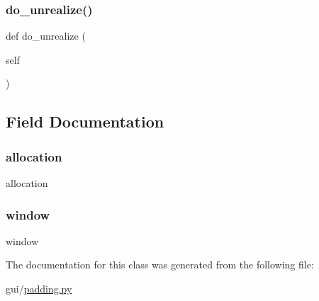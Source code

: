 \subsubsection{\texorpdfstring{do\+\_\+unrealize()}{do\_unrealize()}}
{\footnotesize\ttfamily def do\+\_\+unrealize (\begin{DoxyParamCaption}\item[{}]{self }\end{DoxyParamCaption})}



\subsection{Field Documentation}
\mbox{\label{classpadding_1_1_padding_a95abc93277d25eecef5c7599dfa4b330}} 
\subsubsection{\texorpdfstring{allocation}{allocation}}
{\footnotesize\ttfamily allocation}

\mbox{\label{classpadding_1_1_padding_a04a8a2bbfa9c15500892b8e5033d625b}} 
\subsubsection{\texorpdfstring{window}{window}}
{\footnotesize\ttfamily window}



The documentation for this class was generated from the following file\+:\begin{DoxyCompactItemize}
\item 
gui/\hyperlink{padding_8py}{padding.\+py}\end{DoxyCompactItemize}
